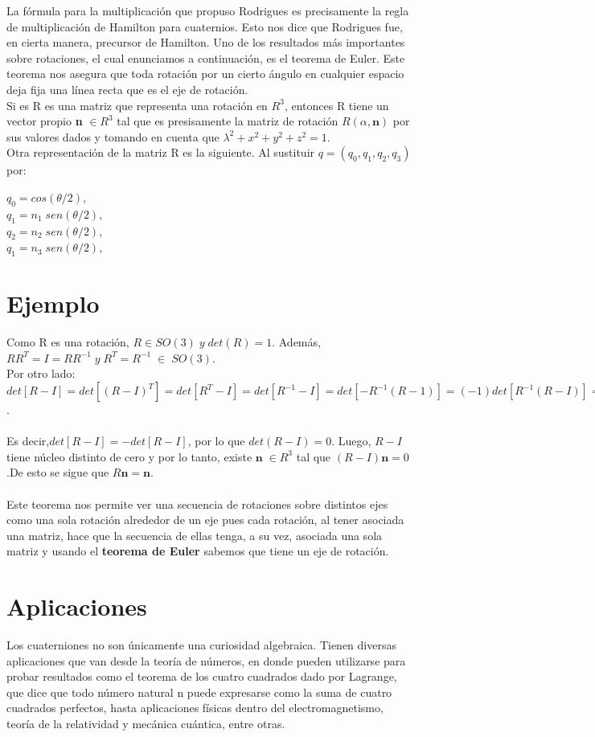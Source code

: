 \documentclass[12pt,a4paper]{report}
\begin{document}
La fórmula para la multiplicación que propuso Rodrigues es precisamente la regla de multiplicación de Hamilton para cuaternios. Esto nos dice que Rodrigues fue, en cierta manera, precursor de Hamilton. Uno de los resultados más importantes sobre rotaciones, el cual enunciamos a continuación, es el teorema de Euler. Este teorema nos asegura que toda rotación por un cierto ángulo en cualquier espacio deja fija una línea recta que es el eje de rotación.\\Si es R es una matriz que representa una rotación en $R^{3}$, entonces R tiene un vector propio \textbf{n} $\in R^{3}$ tal que es presisamente la matriz de rotación $R(\alpha,\textbf{n})$ por sus valores dados y tomando en cuenta que $\lambda^{2}+x^{2}+y^{2}+z^{2}=1$.\\
Otra representación de la matriz R es la siguiente. Al sustituir $q=(q_{0},q_{1},q_{2},q_{3})$ por:
\begin{center}
$q_{0}=cos(\theta/2)$,\\
$q_{1}=n_{1}\;sen(\theta/2),$\\
$q_{2}=n_{2}\;sen(\theta/2),$\\
$q_{1}=n_{3}\;sen(\theta/2),$\\
\end{center}

\section{Ejemplo}
Como R es una rotación, $R\in SO(3)\;y \;det(R)=1$.
Además,\;$RR^{T}=I=RR^{-1}\; y \;R^{T}=R^{-1}\; \in\;SO(3)$.\\
Por otro lado:\\
$det[R-I]=det[(R-I)^{T}]=det[R^{T}-I]=det[R^{-1}-I]=det[-R^{-1}(R-1)]=(-1)det[R^{-1}(R-I)]=-det[R^{-1}]det[R-1=-det[R-I]$.\\\\
Es decir,$det[R-I]=-det[R-I]$, por lo que $det(R-I)=0$.
Luego, $R-I$ tiene núcleo distinto de cero y por lo tanto, existe $\textbf{n}\;\in R^{3}$ tal que $(R-I)\textbf{n}=0$.De esto se sigue que $R\textbf{n}=\textbf{n}$.\\\\
Este teorema nos permite ver una secuencia de rotaciones sobre distintos ejes como una sola rotación alrededor de un eje pues cada rotación, al tener asociada una matriz, hace que la secuencia de ellas tenga, a su vez, asociada una sola matriz y usando el \textbf{teorema de Euler} sabemos que tiene un eje de rotación.
\section{Aplicaciones }
Los cuaterniones no son únicamente una curiosidad algebraica. Tienen diversas aplicaciones que van desde la teoría de números, en donde pueden utilizarse para probar resultados como el teorema de los cuatro cuadrados dado por Lagrange, que dice que todo número natural n puede expresarse como la suma de cuatro cuadrados perfectos, hasta aplicaciones físicas dentro del electromagnetismo, teoría de la relatividad y mecánica cuántica, entre otras.
\end{document}

